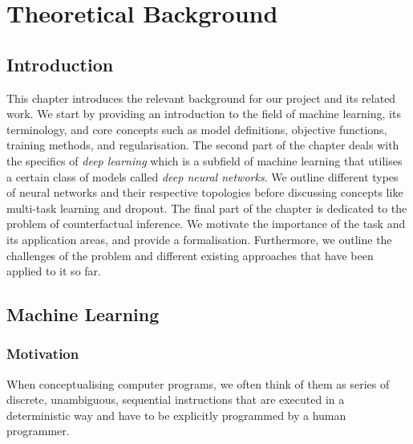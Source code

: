 %

\chapter{\label{ch:2-background}Theoretical Background} 

\section{Introduction}  
This chapter introduces the relevant background for our project and its related work. 
We start by providing an introduction to the field of machine learning, its terminology, and core concepts such as model definitions, objective functions, training methods, and regularisation. The second part of the chapter deals with the specifics of \emph{deep learning} which is a  subfield of machine learning that utilises a certain class of models called \emph{deep neural networks}. We outline different types of neural networks and their respective topologies before discussing concepts like multi-task learning and dropout. The final part of the chapter is dedicated to the problem of counterfactual inference. We motivate the importance of the task and its application areas, and provide a formalisation. Furthermore, we outline the challenges of the problem and different existing approaches that have been applied to it so far. 


\section{Machine Learning}

\subsection{Motivation}
When conceptualising computer programs, we often think of them as series of discrete, unambiguous, sequential instructions that are executed in a deterministic way and have to be explicitly programmed by a human programmer. 

